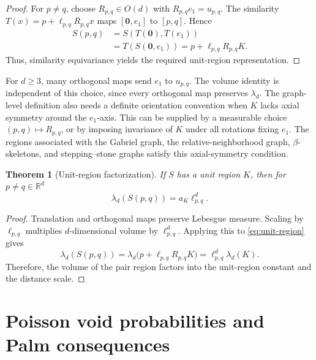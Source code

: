 \documentclass[a4paper,fleqn]{cas-dc}
\numberwithin{equation}{section}
\newcommand{\R}{\mathds{R}}
\newcommand{\1}{\mathds{1}}
\newcommand{\ellpq}{\ell_{p,q}}
\newcommand{\upq}{u_{p,q}}
\newcommand{\0}{\mathbf{0}}
\newtheorem{theorem}{Theorem}[section]
\begin{document}
\begin{proof}
For $p\neq q$, choose $R_{p,q}\in O(d)$ with $R_{p,q}e_1=\upq$.  The similarity $T(x)=p+\ellpq R_{p,q}x$ maps $[\0,e_1]$ to $[p,q]$.
Hence
\begin{equation}
\begin{aligned}
S(p,q)
&=S\left(T(\0),T(e_1)\right)\\
&=T\left(S(\0,e_1)\right)
 =p+\ellpq R_{p,q}K.
\end{aligned}
\end{equation}
Thus, similarity equivariance yields the required unit-region representation.
\end{proof}

For $d\geq 3$, many orthogonal maps send $e_1$ to $\upq$.  The volume identity is independent of this choice, since every orthogonal map preserves $\lambda_d$.  The graph-level definition also needs a definite orientation convention when $K$ lacks axial symmetry around the $e_1$-axis.  This can be supplied by a measurable choice $(p,q)\mapsto R_{p,q}$, or by imposing invariance of $K$ under all rotations fixing $e_1$. The regions associated with the Gabriel graph, the relative-neighborhood graph, $\beta$-skeletons, and stepping--stone graphs satisfy this axial-symmetry condition.

\begin{theorem}[Unit-region factorization]\label{thm:factorization}
If $S$ has a unit region $K$, then for $p\neq q\in \R^d$
\begin{equation}\label{eq:factorization}
        \lambda_d(S(p,q))=a_K\ellpq^d.
\end{equation}
\end{theorem}

\begin{proof}
Translation and orthogonal maps preserve Lebesgue measure. Scaling by $\ellpq$ multiplies $d$-dimensional volume by $\ellpq^d$. Applying this to \eqref{eq:unit-region} gives
\begin{equation}
        \lambda_d(S(p,q))
        =\lambda_d\bigl(p+\ellpq R_{p,q}K\bigr)
        =\ellpq^d\lambda_d(K).
\end{equation}
Therefore, the volume of the pair region factors into the unit-region
constant and the distance scale.
\end{proof}






\section{Poisson void probabilities and Palm consequences}\label{sec:poisson}
\end{document}
